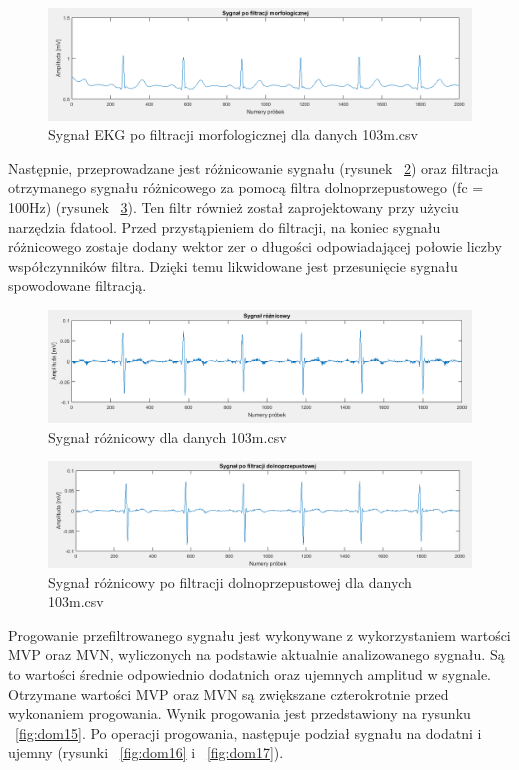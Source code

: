 \documentclass[10pt,a4paper]{article}
\begin{document}
\begin{figure}
  	\centering
    \includegraphics[width=1\textwidth]{dom12}
    \caption{Sygnał EKG po filtracji morfologicznej dla danych 103m.csv}
  	\label{fig:dom12}
\end{figure}

Następnie, przeprowadzane jest różnicowanie sygnału (rysunek ~\ref{fig:dom13}) oraz filtracja otrzymanego sygnału różnicowego za pomocą filtra dolnoprzepustowego (fc = 100Hz) (rysunek ~\ref{fig:dom14}). Ten filtr również został zaprojektowany przy użyciu narzędzia fdatool. Przed przystąpieniem do filtracji, na koniec sygnału różnicowego zostaje dodany wektor zer o długości odpowiadającej połowie liczby współczynników filtra. Dzięki temu likwidowane jest przesunięcie sygnału spowodowane filtracją.
 
\begin{figure}
  	\centering
    \includegraphics[width=1\textwidth]{dom13}
    \caption{Sygnał różnicowy dla danych 103m.csv}
  	\label{fig:dom13}
\end{figure}

\begin{figure}
  	\centering
    \includegraphics[width=1\textwidth]{dom14}
    \caption{Sygnał różnicowy po filtracji dolnoprzepustowej dla danych 103m.csv}
  	\label{fig:dom14}
\end{figure} 
 
Progowanie przefiltrowanego sygnału jest wykonywane z wykorzystaniem wartości MVP oraz MVN, wyliczonych na podstawie aktualnie analizowanego sygnału. Są to wartości średnie odpowiednio dodatnich oraz ujemnych amplitud w sygnale. Otrzymane wartości MVP oraz MVN są zwiększane czterokrotnie przed wykonaniem progowania. Wynik progowania jest przedstawiony na rysunku ~\ref{fig:dom15}. Po operacji progowania, następuje podział sygnału na dodatni i ujemny (rysunki ~\ref{fig:dom16} i ~\ref{fig:dom17}). 
\end{document}
